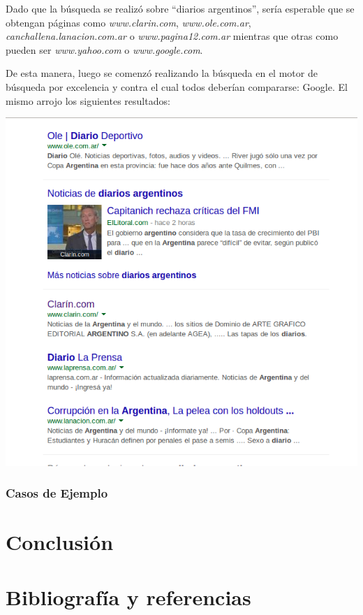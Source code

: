 Dado que la búsqueda se realizó sobre ``diarios argentinos'', sería esperable que se obtengan páginas como \textit{www.clarin.com}, \textit{www.ole.com.ar}, \textit{canchallena.lanacion.com.ar} o \textit{www.pagina12.com.ar} mientras que otras como pueden ser \textit{www.yahoo.com} o \textit{www.google.com}. 
\par 
De esta manera, luego se comenzó realizando la búsqueda en el motor de búsqueda por excelencia y contra el cual todos deberían compararse: Google.
El mismo arrojo los siguientes resultados:

	\par 
	\begin{center}
		\includegraphics[scale=0.5]{./img/primerapaginagoogle.png}
	\end{center}
	\par 


\subsubsection{Casos de Ejemplo}
	
	
\section{Conclusión}


\section{Bibliografía y referencias} %

